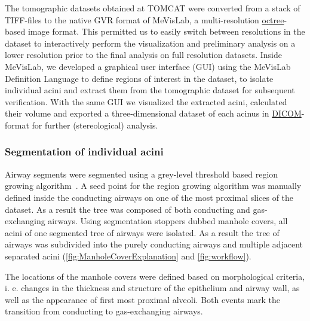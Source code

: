 \documentclass[a4paper,DIV=calc,abstract,english]{scrartcl}
\begin{document}
The tomographic datasets obtained at TOMCAT were converted from a stack of TIFF-files to the native GVR format of MeVisLab, a multi-resolution \href{https://secure.wikimedia.org/wikipedia/en/w/index.php?title=Octree&oldid=409131920}{octree}-based image format.
This permitted us to easily switch between resolutions in the dataset to interactively perform the visualization and preliminary analysis on a lower resolution prior to the final analysis on full resolution datasets.
Inside MeVisLab, we developed a graphical user interface (GUI) using the MeVisLab Definition Language to define regions of interest in the dataset, to isolate individual acini and extract them from the tomographic dataset for subsequent verification.
With the same GUI we visualized the extracted acini, calculated their volume and exported a three-dimensional dataset of each acinus in \href{http://en.wikipedia.org/w/index.php?title=DICOM&oldid=511155074}{DICOM}-format for further (stereological) analysis.

\subsubsection{Segmentation of individual acini}
\label{sec:manhole covers}
Airway segments were segmented using a grey-level threshold based region growing algorithm~\citep{Zucker1976}.
A seed point for the region growing algorithm was manually defined inside the conducting airways on one of the most proximal slices of the dataset.
As a result the tree was composed of both conducting and gas-exchanging airways.
Using segmentation stoppers dubbed manhole covers, all acini of one segmented tree of airways were isolated.
As a result the tree of airways was subdivided into the purely conducting airways and multiple adjacent separated acini (\autoref{fig:ManholeCoverExplanation} and \ref{fig:workflow}).

The locations of the manhole covers were defined based on morphological criteria, i. e. changes in the thickness and structure of the epithelium and airway wall, as well as the appearance of first most proximal alveoli. Both events mark the transition from conducting to gas-exchanging airways.
\end{document}
